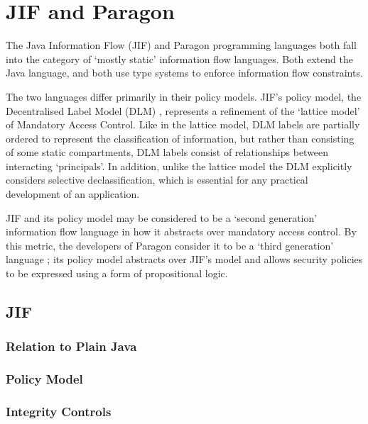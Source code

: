 \chapter{JIF and Paragon} \label{intro_to_jif_para}


The Java Information Flow (JIF) and Paragon programming languages both fall into the category of `mostly static' information flow languages. Both extend the Java language, and both use type systems to enforce information flow constraints.

The two languages differ primarily in their policy models. JIF's policy model, the Decentralised Label Model (DLM) \cite{myers2000dlm}, represents a refinement of the `lattice model' of Mandatory Access Control. Like in the lattice model, DLM labels are partially ordered to represent the classification of information, but rather than consisting of some static compartments, DLM labels consist of relationships between interacting `principals'. In addition, unlike the lattice model the DLM explicitly considers selective declassification, which is essential for any practical development of an application.

JIF and its policy model may be considered to be a `second generation' information flow language in how it abstracts over mandatory access control. By this metric, the developers of Paragon consider it to be a `third generation' language \cite{broberg2013paragon}; its policy model abstracts over JIF's model and allows security policies to be expressed using a form of propositional logic.

\section{JIF}

\subsection{Relation to Plain Java}

\subsection{Policy Model}

\subsection{Integrity Controls}


